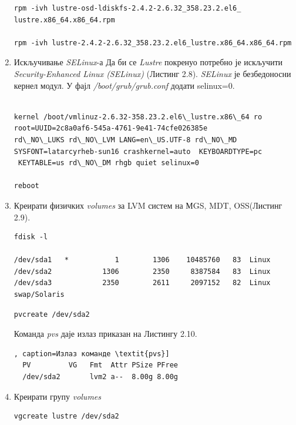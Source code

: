\begin{enumerate}
\begin{lstlisting}[style=nonumbers,frame=single,caption= Инсталација Net-SNMP-а]
rpm -ivh lustre-osd-ldiskfs-2.4.2-2.6.32_358.23.2.el6_
lustre.x86_64.x86_64.rpm

rpm -ivh lustre-2.4.2-2.6.32_358.23.2.el6_lustre.x86_64.x86_64.rpm
\end{lstlisting}


\item Искључивање \textit{SELinux}-а 
Да би се   \textit{Lustre} покренуо потребно је искључити \textit{Security-Enhanced Linux (SELinux)} (Листинг 2.8). \textit{SELinux} је безбедоносни кернел модул.
У фајл \textit{/boot/grub/grub.conf} додати selinux=0.

\begin{lstlisting}[style=nonumbers,frame=single,caption= Команде за искључивање \textit{SELinux}-а]

kernel /boot/vmlinuz-2.6.32-358.23.2.el6\_lustre.x86\_64 ro root=UUID=2c8a0af6-545a-4761-9e41-74cfe026385e 
rd\_NO\_LUKS rd\_NO\_LVM LANG=en\_US.UTF-8 rd\_NO\_MD SYSFONT=latarcyrheb-sun16 crashkernel=auto  KEYBOARDTYPE=pc
 KEYTABLE=us rd\_NO\_DM rhgb quiet selinux=0

reboot 
\end{lstlisting}

\item Креирати физичких \textit{volumes} за LVM систем на МGS, MDT, OSS(Листинг 2.9).
\begin{lstlisting}[style=nonumbers,frame=single, caption=Излаз команде \textit{fdisk -l}]
fdisk -l

/dev/sda1   *           1        1306    10485760   83  Linux
/dev/sda2            1306        2350     8387584   83  Linux
/dev/sda3            2350        2611     2097152   82  Linux swap/Solaris
\end{lstlisting}

\begin{verbatim}
pvcreate /dev/sda2
\end{verbatim}

Команда \textit{pvs} даје излаз приказан на Листингу 2.10.

\begin{lstlisting}[style=nonumbers,frame=single], caption=Излаз команде \textit{pvs}]
  PV         VG   Fmt  Attr PSize PFree
  /dev/sda2       lvm2 a--  8.00g 8.00g
\end{lstlisting}

\item Креирати групу \textit{volumes}

\begin{verbatim}
vgcreate lustre /dev/sda2
\end{verbatim}


\end{enumerate}
